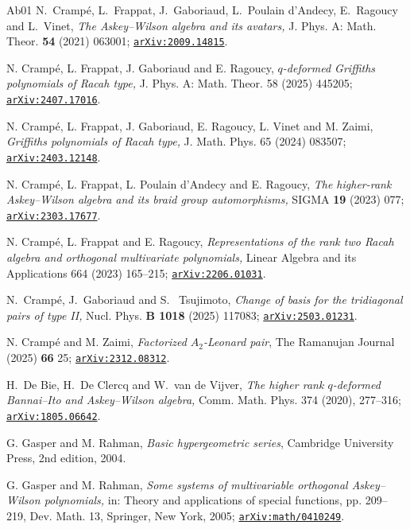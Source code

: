 \documentclass[11pt]{amsart}
\numberwithin{equation}{section}
\numberwithin{equation}{section}
\begin{document}
\begin{thebibliography}{Ab01}
N.~Crampé, L.~Frappat, J.~Gaboriaud, L.~Poulain d'Andecy, E.~Ragoucy and L.~Vinet,
{\it 
 The Askey--Wilson algebra and its avatars,}
J. Phys. A: Math. Theor. {\bf 54} (2021) 063001; \href{https://arxiv.org/abs/2009.14815} {\texttt{arXiv:2009.14815}}.

N. Crampé, L. Frappat, J. Gaboriaud and E. Ragoucy,
{\it $q$-deformed Griffiths polynomials of Racah type,}
J. Phys. A: Math. Theor. 58 (2025) 445205; \href{https://arxiv.org/abs/2407.17016} {\texttt{arXiv:2407.17016}}. 

N. Crampé, L. Frappat, J. Gaboriaud, E. Ragoucy, L. Vinet and M. Zaimi,
{\it Griffiths polynomials of Racah type,}
J. Math. Phys. 65 (2024) 083507; \href{https://arxiv.org/abs/2403.12148} {\texttt{arXiv:2403.12148}}.


N. Crampé, L. Frappat, L. Poulain d'Andecy and E. Ragoucy,
{\it
The higher-rank Askey--Wilson algebra and its braid group automorphisms,}
SIGMA {\bf 19} (2023) 077; 
\href{https://arxiv.org/abs/2303.17677}
{\texttt{arXiv:2303.17677}}. 

N. Cramp\'e, L. Frappat and E. Ragoucy, {\it Representations of the rank two Racah algebra and
orthogonal multivariate polynomials,}
Linear Algebra and its Applications 664 (2023) 165–215;
\href{https://arxiv.org/abs/2206.01031}
{\texttt{arXiv:2206.01031}}.


N.~Crampé, J.~Gaboriaud and S.~ Tsujimoto,
{\it Change of basis for the tridiagonal pairs of type II,}
Nucl. Phys. {\bf B 1018} (2025) 117083; \href{https://arxiv.org/abs/22503.01231}{\texttt{arXiv:2503.01231}}.


N. Crampé and M. Zaimi, {\it Factorized $A_2$-Leonard pair}, The Ramanujan Journal (2025) {\bf 66} 25; \href{https://arxiv.org/abs/2312.08312}
{\tt arXiv:2312.08312}.
 
 

 H.~De Bie, H.~De Clercq and W.~van de Vijver, 
{\it The higher rank $q$-deformed Bannai--Ito and Askey--Wilson algebra,}
Comm. Math. Phys. 374 (2020), 277–316; \href{https://arxiv.org/abs/1805.06642} {\texttt{arXiv:1805.06642}}.

 G. Gasper and M. Rahman, 
\textit{Basic hypergeometric series}, 
Cambridge University Press, 2nd edition, 2004. 

G. Gasper and M. Rahman, 
{\it Some systems of multivariable orthogonal Askey--Wilson polynomials,}
in: Theory and applications of special functions, pp. 209–219, Dev. Math. 13, Springer, New
York, 2005;  	 \href{https://arxiv.org/abs/math/0410249} {\texttt{arXiv:math/0410249}}.


\end{thebibliography}
\end{document}
